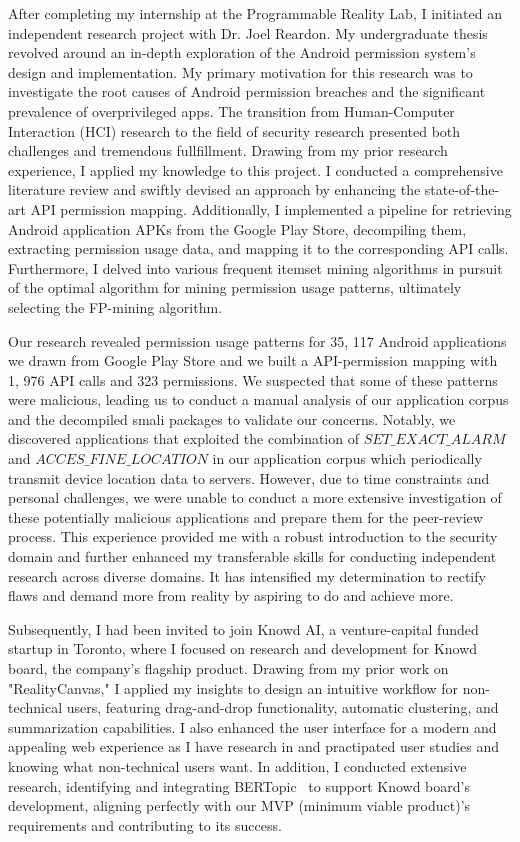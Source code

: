 \documentclass{article}
\begin{document}
After completing my internship at the Programmable Reality Lab, I initiated an independent research project with Dr. Joel Reardon.
My undergraduate thesis revolved around an in-depth exploration of the Android permission system's design and implementation. 
My primary motivation for this research was to investigate the root causes of Android permission breaches 
and the significant prevalence of overprivileged apps.
The transition from Human-Computer Interaction (HCI) research to the field of security research presented both challenges and 
tremendous fullfillment. Drawing from my prior research experience, I applied my knowledge to this project. 
I conducted a comprehensive literature review and swiftly devised an approach by enhancing the state-of-the-art API 
permission mapping. Additionally, I implemented a pipeline for retrieving Android application APKs from the Google Play Store, 
decompiling them, extracting permission usage data, and mapping it to the corresponding API calls. 
Furthermore, I delved into various frequent itemset mining algorithms in pursuit of the optimal algorithm for 
mining permission usage patterns, ultimately selecting the FP-mining algorithm.

Our research revealed permission usage patterns for 35, 117 Android
applications we drawn from Google Play Store and we built a 
API-permission mapping with 1, 976 API calls and 323 permissions. We suspected that some of these patterns were malicious, 
leading us to conduct a manual analysis of our application corpus and the decompiled smali packages to
validate our concerns. Notably, we discovered applications that exploited the combination of \textit{$SET\_EXACT\_ALARM$} and 
\textit{$ACCES\_FINE\_LOCATION$} in our application corpus which periodically transmit device location data to servers. 
However, due to time constraints and personal challenges, we were unable to conduct a 
more extensive investigation of these potentially malicious applications and prepare them for the peer-review process.
This experience provided me with a robust introduction to the security domain and further enhanced my transferable skills 
for conducting independent research across diverse domains. It has intensified my determination to rectify
flaws and demand more from reality by aspiring to do and achieve more.




Subsequently, I had been invited to join Knowd AI, a venture-capital funded startup in Toronto, where I focused on 
research and development for Knowd board, the company's flagship product. 
Drawing from my prior work on "RealityCanvas," I applied my insights to design an intuitive 
workflow for non-technical users, featuring drag-and-drop functionality, automatic clustering, 
and summarization capabilities. I also enhanced the user interface for a modern and appealing web experience as I have 
research in and practipated user studies and knowing what non-technical users want. 
In addition, I conducted extensive research, identifying and integrating BERTopic~\cite{BERT} to support Knowd board's development, 
aligning perfectly with our MVP (minimum viable product)'s requirements and contributing to its success.
\end{document}
